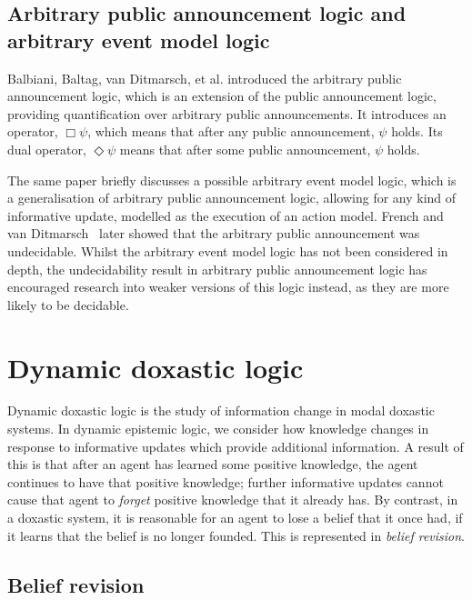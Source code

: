 \subsection*{Arbitrary public announcement logic and arbitrary event model
logic}

Balbiani, Baltag, van Ditmarsch, et al.\cite{balbiani2007arbitrary} introduced
the arbitrary public announcement logic, which is an extension of the public
announcement logic, providing quantification over arbitrary public
announcements. It introduces an operator, $\Box\psi$, which means that after any
public announcement, $\psi$ holds. Its dual operator, $\Diamond\psi$ means that
after some public announcement, $\psi$ holds.

The same paper briefly discusses a possible arbitrary event model logic, which
is a generalisation of arbitrary public announcement logic, allowing for any
kind of informative update, modelled as the execution of an action model. French
and van Ditmarsch~\cite{french2008undecidability} later showed that the
arbitrary public announcement was undecidable. Whilst the arbitrary event model
logic has not been considered in depth, the undecidability result in arbitrary
public announcement logic has encouraged research into weaker versions of this
logic instead, as they are more likely to be decidable.

\section{Dynamic doxastic logic}

Dynamic doxastic logic is the study of information change in modal doxastic
systems. In dynamic epistemic logic, we consider how knowledge changes in
response to informative updates which provide additional information. A result
of this is that after an agent has learned some positive knowledge, the agent
continues to have that positive knowledge; further informative updates cannot
cause that agent to {\em forget} positive knowledge that it already has. By
contrast, in a doxastic system, it is reasonable for an agent to lose a belief
that it once had, if it learns that the belief is no longer founded. This is
represented in {\em belief revision}.

\subsection{Belief revision}


